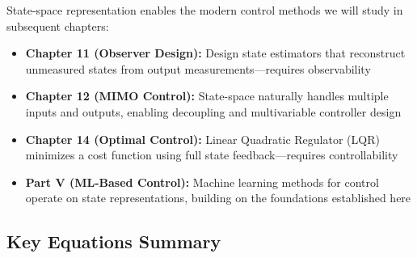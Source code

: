 State-space representation enables the modern control methods we will study in subsequent chapters:

\begin{itemize}
    \item \textbf{Chapter 11 (Observer Design):} Design state estimators that reconstruct unmeasured states from output measurements---requires observability

    \item \textbf{Chapter 12 (MIMO Control):} State-space naturally handles multiple inputs and outputs, enabling decoupling and multivariable controller design

    \item \textbf{Chapter 14 (Optimal Control):} Linear Quadratic Regulator (LQR) minimizes a cost function using full state feedback---requires controllability

    \item \textbf{Part V (ML-Based Control):} Machine learning methods for control operate on state representations, building on the foundations established here
\end{itemize}

\subsection{Key Equations Summary}

